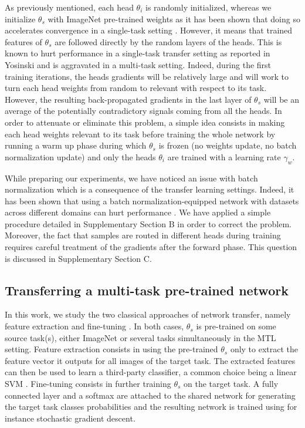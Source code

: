 As previously mentioned, each head $\theta_i$ is randomly initialized, whereas we initialize $\theta_s$ with ImageNet pre-trained weights as it has been shown that doing so accelerates convergence in a single-task setting \cite{mormont2018comparison}. However, it means that trained features of $\theta_s$ are followed directly by the random layers of the heads. This is known to hurt performance in a single-task transfer setting as reported in Yosinski \etal \cite{yosinski2014transferable} and is aggravated in a multi-task setting. Indeed, during the first training iterations, the heads gradients will be relatively large and will work to turn each head weights from random to relevant with respect to its task. However, the resulting back-propagated gradients in the last layer of $\theta_s$ will be an average of the potentially contradictory signals coming from all the heads. In order to attenuate or eliminate this problem, a simple idea consists in making each head weights relevant to its task before training the whole network by running a warm up phase during which $\theta_s$ is frozen (\ie no weights update, no batch normalization update) and only the heads $\theta_i$ are trained with a learning rate $\gamma_w$. 

While preparing our experiments, we have noticed an issue with batch normalization \cite{ioffe2015batch} which is a consequence of the transfer learning settings. Indeed, it has been shown that using a batch normalization-equipped network with datasets across different domains can hurt performance \cite{li2018adaptive, chang2019domain}. We have applied a simple procedure detailed in Supplementary Section B in order to correct the problem. Moreover, the fact that samples are routed in different heads during training requires careful treatment of the gradients after the forward phase. This question is discussed in Supplementary Section C.

\subsection{Transferring a multi-task pre-trained network}
\label{ssec:mtask:transfer_techniques}

In this work, we study the two classical approaches of network transfer, namely feature extraction and fine-tuning \cite{litjens2017survey}. In both cases, $\theta_s$ is pre-trained on some source task(s), either ImageNet or several tasks simultaneously in the MTL setting. Feature extraction consists in using the pre-trained $\theta_s$ only to extract the feature vector it outputs for all images of the target task. The extracted features can then be used to learn a third-party classifier, a common choice being a linear SVM \cite{razavian2014cnn, mormont2018comparison}. Fine-tuning consists in further training $\theta_s$ on the target task. A fully connected layer and a softmax are attached to the shared network for generating the target task classes probabilities and the resulting network is trained using for instance stochastic gradient descent. 

